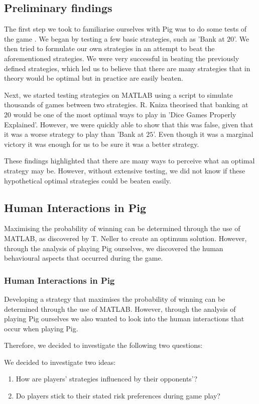 \documentclass[a4paper,titlepage]{article}
\begin{document}
\subsection{Preliminary findings}
The first step we took to familiarise ourselves with Pig was to do some tests of the game . We began by testing a few basic strategies, such as 'Bank at $20$'. We then tried to formulate our own strategies in an attempt to beat the aforementioned strategies. We were very successful in beating the previously defined strategies, which led us to believe that there are many strategies that in theory would be optimal but in practice are easily beaten.

Next, we started testing strategies on MATLAB using a script to simulate thousands of games between two strategies. R. Kniza theorised that banking at $20$ would be one of the most optimal ways to play in 'Dice Games Properly Explained'. However, we were quickly able to show that this was false, given that it was a worse strategy to play than 'Bank at $25$'. Even though it was a marginal victory it was enough for us to be sure it was a better strategy.

These findings highlighted that there are many ways to perceive what an optimal strategy may be. However, without extensive testing, we did not know if these hypothetical optimal strategies could be beaten easily.

\subsection{Human Interactions in Pig}
Maximising the probability of winning can be determined through the use of MATLAB, as discovered by T. Neller\cite{neller2004optimal} to create an optimum solution. However, through the analysis of playing Pig ourselves, we discovered the human behavioural aspects that occurred during the game.


\subsubsection{Human Interactions in Pig}
Developing a strategy that maximises the probability of winning can be determined through the use of MATLAB. However, through the analysis of playing Pig ourselves we also wanted to look into the human interactions that occur when playing Pig.

Therefore, we decided to investigate the following two questions:

We decided to investigate two ideas:
\begin{enumerate}
\item How are players' strategies influenced by their opponents'?
\item Do players stick to their stated risk preferences during game play?
\end{enumerate}
\end{document}
